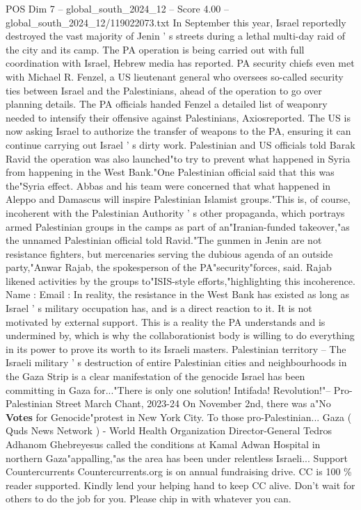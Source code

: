 \begin{textsample}{POS Dim 7 – global\_south\_2024\_12 – Score 4.00 – global\_south\_2024\_12/119022073.txt}
In September this year, Israel reportedly destroyed the vast majority of Jenin ' s streets during a lethal multi-day raid of the city and its camp.
The PA operation is being carried out with full coordination with Israel, Hebrew media has reported.
PA security chiefs even met with Michael R.
Fenzel, a US lieutenant general who oversees so-called security ties between Israel and the Palestinians, ahead of the operation to go over planning details.
The PA officials handed Fenzel a detailed list of weaponry needed to intensify their offensive against Palestinians, Axiosreported.
The US is now asking Israel to authorize the transfer of weapons to the PA, ensuring it can continue carrying out Israel ' s dirty work.
Palestinian and US officials told Barak Ravid the operation was also launched"to try to prevent what happened in Syria from happening in the West Bank."One Palestinian official said that this was the"Syria effect.
Abbas and his team were concerned that what happened in Aleppo and Damascus will inspire Palestinian Islamist groups."This is, of course, incoherent with the Palestinian Authority ' s other propaganda, which portrays armed Palestinian groups in the camps as part of an"Iranian-funded takeover,"as the unnamed Palestinian official told Ravid."The gunmen in Jenin are not resistance fighters, but mercenaries serving the dubious agenda of an outside party,"Anwar Rajab, the spokesperson of the PA"security"forces, said.
Rajab likened activities by the groups to"ISIS-style efforts,"highlighting this incoherence.
Name : Email : In reality, the resistance in the West Bank has existed as long as Israel ' s military occupation has, and is a direct reaction to it.
It is not motivated by external support.
This is a reality the PA understands and is undermined by, which is why the collaborationist body is willing to do everything in its power to prove its worth to its Israeli masters.
Palestinian territory -- The Israeli military ' s destruction of entire Palestinian cities and neighbourhoods in the Gaza Strip is a clear manifestation of the genocide Israel has been committing in Gaza for..."There is only one solution!
Intifada!
Revolution!"-- Pro-Palestinian Street March Chant, 2023-24 On November 2nd, there was a"No \textbf{Votes} for Genocide"protest in New York City.
To those pro-Palestinian...
Gaza ( Quds News Network ) - World Health Organization Director-General Tedros Adhanom Ghebreyesus called the conditions at Kamal Adwan Hospital in northern Gaza"appalling,"as the area has been under relentless Israeli...
Support Countercurrents Countercurrents.org is on annual fundraising drive.
CC is 100 \% reader supported.
Kindly lend your helping hand to keep CC alive.
Don't wait for others to do the job for you.
Please chip in with whatever you can.

\end{textsample}
